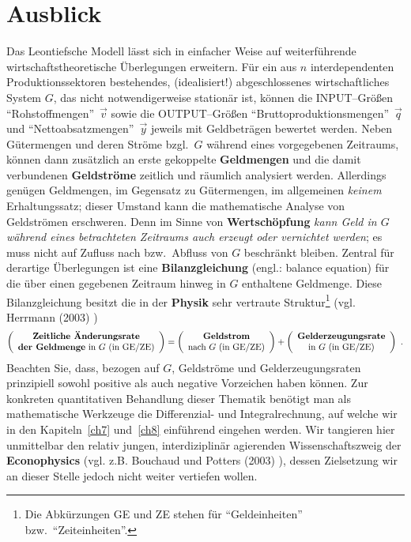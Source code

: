 \section[Ausblick]%
{Ausblick}
Das Leontiefsche Modell l\"asst sich in einfacher Weise auf
weiterf\"uhrende wirtschaftstheoretische \"Uberlegungen 
erweitern. F\"ur ein aus $n$ interdependenten Produktionssektoren
bestehendes, (idealisiert!) abgeschlossenes
wirtschaftliches System $G$, das nicht notwendigerweise 
station\"{a}r ist, k\"onnen die INPUT--Gr\"o\ss en
"`Rohstoffmengen"'~$\vec{v}$ sowie die OUTPUT--Gr\"o\ss en
"`Bruttoproduktionsmengen"'~$\vec{q}$ und
"`Nettoabsatzmengen"'~$\vec{y}$ jeweils mit Geldbetr\"agen
bewertet werden. Neben G\"utermengen und deren Str\"ome bzgl.~$G$
w\"ahrend eines vorgegebenen Zeitraums, k\"onnen dann zus\"atzlich
an erste gekoppelte {\bf Geldmengen} und die damit verbundenen
{\bf Geldstr\"ome} zeitlich und r\"aumlich analysiert werden.
Allerdings gen\"ugen Geldmengen, im Gegensatz zu G\"utermengen,
im allgemeinen {\em keinem\/} Erhaltungssatz; dieser Umstand kann
die mathematische Analyse von Geldstr\"omen erschweren. Denn im
Sinne von {\bf Wertsch\"opfung} {\em kann Geld in $G$ w\"ahrend
eines betrachteten Zeitraums auch erzeugt oder vernichtet
werden\/}; es muss nicht auf Zufluss nach bzw.\ Abfluss von $G$
beschr\"ankt bleiben. Zentral f\"ur derartige \"Uberlegungen
ist eine {\bf Bilanzgleichung} (engl.: balance equation) f\"ur die 
\"uber einen
gegebenen Zeitraum hinweg in $G$ enthaltene Geldmenge.
Diese Bilanzgleichung besitzt die in der {\bf Physik} sehr 
vertraute Struktur\footnote{Die Abk\"urzungen GE und ZE stehen 
f\"ur "`Geldeinheiten"' bzw.\ "`Zeiteinheiten"'.} (vgl. Herrmann 
(2003) )
%
\[
\left(\begin{array}{c}
\text{{\bf Zeitliche \"Anderungsrate}} \\
\text{{\bf der Geldmenge} in}\ G\ \text{(in GE/ZE)}
\end{array}\right)
= \left(\begin{array}{c}
\text{{\bf Geldstrom}} \\
\text{nach}\ G\ \text{(in GE/ZE)}
\end{array}\right)
+ \left(\begin{array}{c}
\text{{\bf Gelderzeugungsrate}} \\
\text{in}\ G\ \text{(in GE/ZE)}
\end{array}\right) \ .
\]
%
Beachten Sie, dass, bezogen auf $G$, Geldstr\"ome und
Gelderzeugungsraten prinzipiell sowohl positive als auch
negative Vorzeichen haben k\"onnen. Zur konkreten quantitativen
Behandlung dieser Thematik ben\"otigt man als mathematische
Werkzeuge die Differenzial- und Integralrechnung, auf
welche wir in den Kapiteln~\ref{ch7} und~\ref{ch8}
einf\"uhrend eingehen werden. Wir tangieren hier unmittelbar
den relativ jungen, interdiziplin\"ar agierenden
Wissenschaftszweig der {\bf Econophysics} (vgl. z.B. Bouchaud
und Potters (2003) ), dessen Zielsetzung
wir an dieser Stelle jedoch nicht weiter vertiefen wollen.


